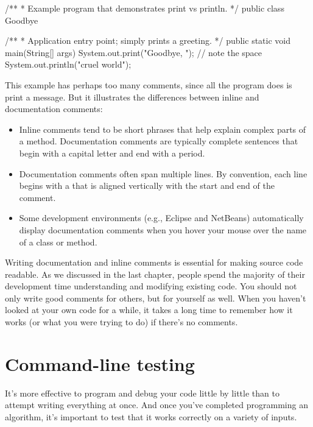 \begin{code}
/**
 * Example program that demonstrates print vs println.
 */
public class Goodbye {

    /**
     * Application entry point; simply prints a greeting.
     */
    public static void main(String[] args) {
        System.out.print("Goodbye, ");  // note the space
        System.out.println("cruel world");
    }

}
\end{code}

This example has perhaps too many comments, since all the program does is print a message.
But it illustrates the differences between inline and documentation comments:

\begin{itemize}
\item Inline comments tend to be short phrases that help explain complex parts of a method.
Documentation comments are typically complete sentences that begin with a capital letter and end with a period.

\item Documentation comments often span multiple lines.
By convention, each line begins with a {\tt *} that is aligned vertically with the start and end of the comment.

\item Some development environments (e.g., Eclipse and NetBeans) automatically display documentation comments when you hover your mouse over the name of a class or method.

\end{itemize}

Writing documentation and inline comments is essential for making source code readable.
As we discussed in the last chapter, people spend the majority of their development time understanding and modifying existing code.
You should not only write good comments for others, but for yourself as well.
When you haven't looked at your own code for a while, it takes a long time to remember how it works (or what you were trying to do) if there's no comments.


\section{Command-line testing}

It's more effective to program and debug your code little by little than to attempt writing everything at once.
And once you've completed programming an algorithm, it's important to test that it works correctly on a variety of inputs.

